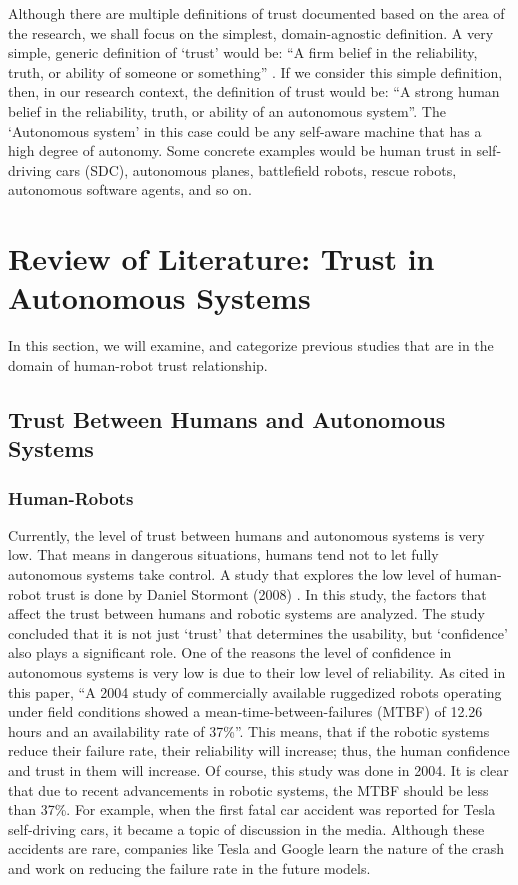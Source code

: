 \documentclass[runningheads,a4paper]{llncs}
\begin{document}
Although there are multiple definitions of trust documented based on the area of the research,  we shall focus on the simplest, domain-agnostic definition. A very simple, generic definition of `trust' would be: ``A firm belief in the reliability, truth, or ability of someone or something'' \cite{oxfordDicTrust}. If we consider this simple definition, then, in our research context, the definition of trust would be: ``A strong human belief in the reliability, truth, or ability of an autonomous system''. The `Autonomous system' in this case could be any self-aware machine that has a high degree of autonomy. Some concrete examples would be human trust in self-driving cars (SDC), autonomous planes, battlefield robots, rescue robots, autonomous software agents, and so on.

\section{Review of Literature: Trust in Autonomous Systems}
In this section, we will examine, and categorize previous studies that are in the domain of human-robot trust relationship.

\subsection{Trust Between Humans and Autonomous Systems}

\subsubsection{Human-Robots}
 Currently, the level of trust between humans and autonomous systems is very low. That means in dangerous situations, humans tend not to let fully autonomous systems take control. A study that explores the low level of human-robot trust is done by Daniel Stormont (2008) \cite{stormont2008analyzing}. In this study, the factors that affect the trust between humans and robotic systems are analyzed. The study concluded that it is not just `trust' that determines the usability, but `confidence' also plays a significant role. One of the reasons the level of confidence in autonomous systems is very low is due to their low level of reliability. As cited in this paper, ``A 2004 study of commercially available ruggedized robots operating under
field conditions showed a mean-time-between-failures
(MTBF) of 12.26 hours and an availability rate of 37\%''\cite{carlson2004investigation}. This means, that if the robotic systems reduce their failure rate, their reliability will increase; thus, the human confidence and trust in them will increase. Of course, this study was done in 2004. It is clear that due to recent advancements in robotic systems, the MTBF should be less than 37\%. For example, when the first fatal car accident was reported for Tesla self-driving cars, it became a topic of discussion in the media. Although these accidents are rare, companies like Tesla and Google learn the nature of the crash and work on reducing the failure rate in the future models. \cite{TeslaFatalAccident}
\end{document}
